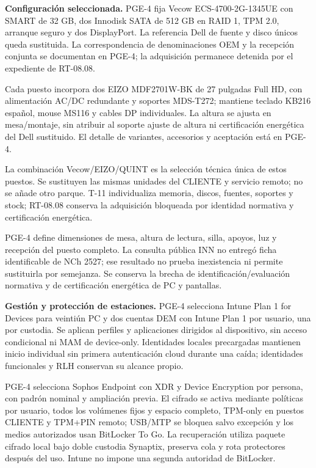 \textbf{Configuración seleccionada.} PGE-4 fija Vecow ECS-4700-2G-1345UE con SMART de 32 GB, dos Innodisk SATA de 512 GB en RAID 1, TPM 2.0, arranque seguro y dos DisplayPort. La referencia Dell de fuente y disco únicos queda sustituida. La correspondencia de denominaciones OEM y la recepción conjunta se documentan en PGE-4; la adquisición permanece detenida por el expediente de RT-08.08.

Cada puesto incorpora dos EIZO MDF2701W-BK de 27 pulgadas Full HD, con alimentación AC/DC redundante y soportes MDS-T272; mantiene teclado KB216 español, mouse MS116 y cables DP individuales. La altura se ajusta en mesa/montaje, sin atribuir al soporte ajuste de altura ni certificación energética del Dell sustituido. El detalle de variantes, accesorios y aceptación está en PGE-4.

La combinación Vecow/EIZO/QUINT es la selección técnica única de estos puestos. Se sustituyen las mismas unidades del CLIENTE y servicio remoto; no se añade otro parque. T-11 individualiza memoria, discos, fuentes, soportes y stock; RT-08.08 conserva la adquisición bloqueada por identidad normativa y certificación energética.

PGE-4 define dimensiones de mesa, altura de lectura, silla, apoyos, luz y recepción del puesto completo. La consulta pública INN no entregó ficha identificable de NCh 2527; ese resultado no prueba inexistencia ni permite sustituirla por semejanza. Se conserva la brecha de identificación/evaluación normativa y de certificación energética de PC y pantallas.

\textbf{Gestión y protección de estaciones.} PGE-4 selecciona Intune Plan 1 for Devices para veintiún PC y dos cuentas DEM con Intune Plan 1 por usuario, una por custodia. Se aplican perfiles y aplicaciones dirigidos al dispositivo, sin acceso condicional ni MAM de device-only. Identidades locales precargadas mantienen inicio individual sin primera autenticación cloud durante una caída; identidades funcionales y RLH conservan su alcance propio.

PGE-4 selecciona Sophos Endpoint con XDR y Device Encryption por persona, con padrón nominal y ampliación previa. El cifrado se activa mediante políticas por usuario, todos los volúmenes fijos y espacio completo, TPM-only en puestos CLIENTE y TPM+PIN remoto; USB/MTP se bloquea salvo excepción y los medios autorizados usan BitLocker To Go. La recuperación utiliza paquete cifrado local bajo doble custodia Synaptix, preserva cola y rota protectores después del uso. Intune no impone una segunda autoridad de BitLocker.

